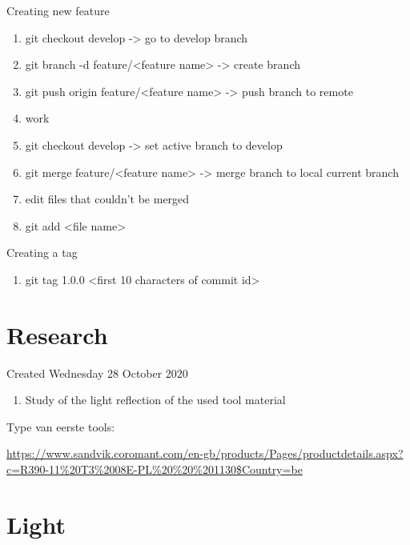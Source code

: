 \documentclass{article}
\begin{document}
Creating new feature

\begin{enumerate}[1]
\item git checkout develop	-\textgreater{} go to develop branch
\item git branch -d feature/\textless{}feature name\textgreater{}		-\textgreater{} create branch
\item git push origin feature/\textless{}feature name\textgreater{}	-\textgreater{} push branch to remote
\item work
\item git checkout develop					-\textgreater{} set active branch to develop
\item git merge feature/\textless{}feature name\textgreater{}		-\textgreater{} merge branch to local current branch
\item edit files that couldn't be merged
\item git add \textless{}file name\textgreater{}
\end{enumerate}


Creating a tag 

\begin{enumerate}[1]
\item git tag 1.0.0 \textless{}first 10 characters of commit id\textgreater{}
\end{enumerate}

		\section{Research}

Created Wednesday 28 October 2020



\begin{enumerate}[1]
\item Study of the light reflection of the used tool material
\end{enumerate}




Type van eerste tools: 

\href{https://www.sandvik.coromant.com/en-gb/products/Pages/productdetails.aspx?c=R390-11%20T3%2008E-PL%20%20%201130&Country=be}{https://www.sandvik.coromant.com/en-gb/products/Pages/productdetails.aspx?c=R390-11\%20T3\%2008E-PL\%20\%20\%201130\$Country=be}




		\section{Light}
\end{document}
